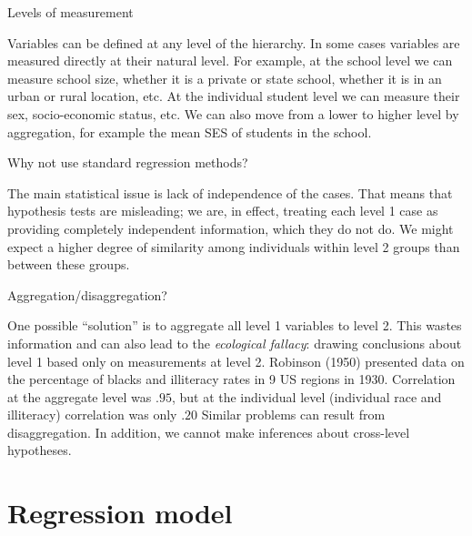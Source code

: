 \documentclass[10pt,ignorenonframetext,]{beamer}
\begin{document}
\begin{frame}{Levels of measurement}

Variables can be defined at any level of the hierarchy. In some cases
variables are measured directly at their natural level. For example, at
the school level we can measure school size, whether it is a private or
state school, whether it is in an urban or rural location, etc. At the
individual student level we can measure their sex, socio-economic
status, etc. We can also move from a lower to higher level by
aggregation, for example the mean SES of students in the school.

\end{frame}

\begin{frame}{Why not use standard regression methods?}

The main statistical issue is lack of independence of the cases. That
means that hypothesis tests are misleading; we are, in effect, treating
each level 1 case as providing completely independent information, which
they do not do. We might expect a higher degree of similarity among
individuals within level 2 groups than between these groups.

\end{frame}

\begin{frame}{Aggregation/disaggregation?}

One possible ``solution'' is to aggregate all level 1 variables to level
2. This wastes information and can also lead to the \emph{ecological
fallacy}: drawing conclusions about level 1 based only on measurements
at level 2. Robinson (1950) presented data on the percentage of blacks
and illiteracy rates in 9 US regions in 1930. Correlation at the
aggregate level was \(.95\), but at the individual level (individual
race and illiteracy) correlation was only \(.20\) Similar problems can
result from disaggregation. In addition, we cannot make inferences about
cross-level hypotheses.

\end{frame}

\section{Regression model}\label{regression-model}
\end{document}
